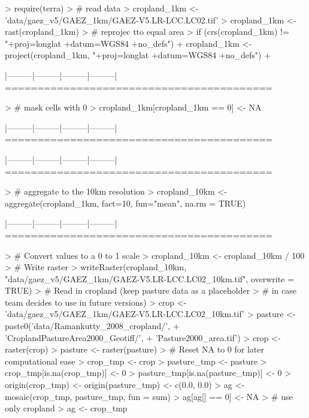 \documentclass{article}
\begin{document}
\begin{Schunk}
\begin{Sinput}
> require(terra)
> # read data
> cropland_1km <- 'data/gaez_v5/GAEZ_1km/GAEZ-V5.LR-LCC.LC02.tif'
> cropland_1km <- rast(cropland_1km)
> # reprojec tto equal area
> if (crs(cropland_1km) != "+proj=longlat +datum=WGS84 +no_defs") {
+   cropland_1km <- project(cropland_1km, "+proj=longlat +datum=WGS84 +no_defs")
+ }
\end{Sinput}
\begin{Soutput}
|---------|---------|---------|---------|
=========================================
\end{Soutput}
\begin{Sinput}
> # mask cells with 0%
> cropland_1km[cropland_1km == 0] <- NA
\end{Sinput}
\begin{Soutput}
|---------|---------|---------|---------|
=========================================
                                          

|---------|---------|---------|---------|
=========================================
\end{Soutput}
\begin{Sinput}
> # aggregate to the 10km resolution
> cropland_10km <- aggregate(cropland_1km, fact=10, fun="mean", na.rm = TRUE)
\end{Sinput}
\begin{Soutput}
|---------|---------|---------|---------|
=========================================
\end{Soutput}
\begin{Sinput}
> # Convert values to a 0 to 1 scale
> cropland_10km <- cropland_10km / 100
> # Write raster
> writeRaster(cropland_10km, "data/gaez_v5/GAEZ_1km/GAEZ-V5.LR-LCC.LC02_10km.tif", overwrite = TRUE)
> # Read in cropland (keep pasture data as a placeholder
> # in case team decides to use in future versions)
> crop <- 'data/gaez_v5/GAEZ_1km/GAEZ-V5.LR-LCC.LC02_10km.tif'
> pasture <- paste0('data/Ramankutty_2008_cropland/',
+                   'CroplandPastureArea2000_Geotiff/',
+                   'Pasture2000_area.tif')
> crop <- raster(crop)
> pasture <- raster(pasture)
> # Reset NA to 0 for later computational ease
> crop_tmp <- crop
> pasture_tmp <- pasture
> crop_tmp[is.na(crop_tmp)] <- 0
> pasture_tmp[is.na(pasture_tmp)] <- 0
> origin(crop_tmp) <- origin(pasture_tmp) <- c(0.0, 0.0)
> ag <- mosaic(crop_tmp, pasture_tmp, fun = sum)
> ag[ag[] == 0] <- NA
> # use only cropland
> ag <- crop_tmp
\end{Sinput}
\end{Schunk}
\end{document}
